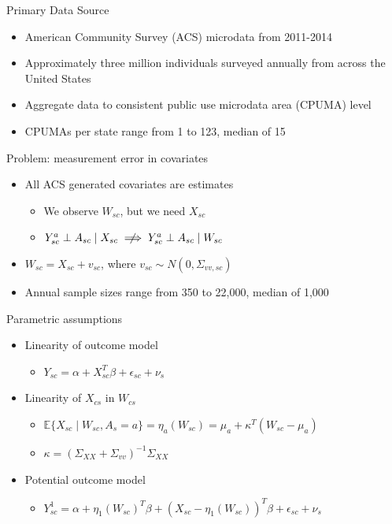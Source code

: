 \documentclass[hyperref={pdfpagelabels=false}]{beamer}
\begin{document}
\begin{frame}{Primary Data Source}
    \begin{itemize}
    \item American Community Survey (ACS) microdata from 2011-2014 \bigskip 
    \item Approximately three million individuals surveyed annually from across the United States \bigskip 
    \item Aggregate data to consistent public use microdata area (CPUMA) level \bigskip
    \item CPUMAs per state range from 1 to 123, median of 15
    \end{itemize}
\end{frame}   

\begin{frame}{Problem: measurement error in covariates}
    \begin{itemize}
        \item All ACS generated covariates are estimates \bigskip
        \begin{itemize}
            \item We observe $W_{sc}$, but we need $X_{sc}$ \bigskip
            \item $Y_{sc}^a \perp A_{sc} \mid X_{sc} \centernot\implies Y_{sc}^a \perp A_{sc} \mid W_{sc}$ \bigskip
        \end{itemize}
        \item $W_{sc} = X_{sc} + v_{sc}$, where $v_{sc} \sim N(0, \Sigma_{vv, sc})$ \bigskip
        \item Annual sample sizes range from 350 to 22,000, median of 1,000 \bigskip
    \end{itemize}
\end{frame}

\begin{frame}{Parametric assumptions}
    \begin{itemize}
        \item Linearity of outcome model \bigskip
        \begin{itemize}
            \item $Y_{sc} = \alpha + X_{sc}^T\beta + \epsilon_{sc} + \nu_s$ \bigskip
        \end{itemize}
        \item Linearity of $X_{cs}$ in $W_{cs}$ \bigskip 
        \begin{itemize}
            \item $\mathbb{E}\{X_{sc} \mid W_{sc}, A_s = a\} = \eta_a(W_{sc}) = \mu_a + \kappa^T(W_{sc} - \mu_a)$ \bigskip
            \item $\kappa = (\Sigma_{XX} + \Sigma_{vv})^{-1}\Sigma_{XX}$ \bigskip
        \end{itemize}
        \item Potential outcome model \bigskip
        \begin{itemize}
            \item $Y_{sc}^1 = \alpha + \eta_1(W_{sc})^T\beta + (X_{sc} - \eta_1(W_{sc}))^T\beta + \epsilon_{sc} + \nu_{s}$
        \end{itemize}
    \end{itemize}
\end{frame}
\end{document}

